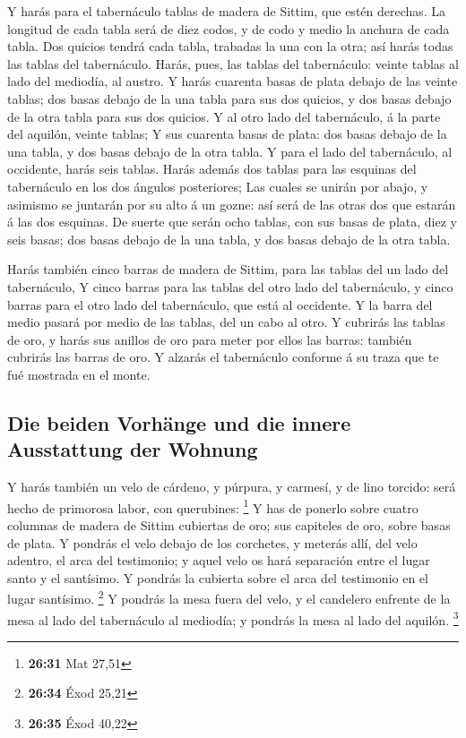  Y harás para el tabernáculo tablas de madera de Sittim,
que estén derechas.  La longitud de cada tabla será de
diez codos, y de codo y medio la anchura de cada tabla. 
Dos quicios tendrá cada tabla, trabadas la una con la otra; así harás
todas las tablas del tabernáculo.  Harás, pues, las
tablas del tabernáculo: veinte tablas al lado del mediodía, al austro.
 Y harás cuarenta basas de plata debajo de las veinte
tablas; dos basas debajo de la una tabla para sus dos quicios, y dos
basas debajo de la otra tabla para sus dos quicios.  Y al
otro lado del tabernáculo, á la parte del aquilón, veinte tablas;
 Y sus cuarenta basas de plata: dos basas debajo de la
una tabla, y dos basas debajo de la otra tabla.  Y para
el lado del tabernáculo, al occidente, harás seis tablas.
 Harás además dos tablas para las esquinas del
tabernáculo en los dos ángulos posteriores;  Las cuales
se unirán por abajo, y asimismo se juntarán por su alto á un gozne: así
será de las otras dos que estarán á las dos esquinas.  De
suerte que serán ocho tablas, con sus basas de plata, diez y seis basas;
dos basas debajo de la una tabla, y dos basas debajo de la otra tabla.

 Harás también cinco barras de madera de Sittim, para las
tablas del un lado del tabernáculo,  Y cinco barras para
las tablas del otro lado del tabernáculo, y cinco barras para el otro
lado del tabernáculo, que está al occidente.  Y la barra
del medio pasará por medio de las tablas, del un cabo al otro.
 Y cubrirás las tablas de oro, y harás sus anillos de oro
para meter por ellos las barras: también cubrirás las barras de oro.
 Y alzarás el tabernáculo conforme á su traza que te fué
mostrada en el monte.

\hypertarget{die-beiden-vorhuxe4nge-und-die-innere-ausstattung-der-wohnung}{%
\subsection{Die beiden Vorhänge und die innere Ausstattung der
Wohnung}\label{die-beiden-vorhuxe4nge-und-die-innere-ausstattung-der-wohnung}}

 Y harás también un velo de cárdeno, y púrpura, y
carmesí, y de lino torcido: será hecho de primorosa labor, con
querubines: \footnote{\textbf{26:31} Mat 27,51}  Y has de
ponerlo sobre cuatro columnas de madera de Sittim cubiertas de oro; sus
capiteles de oro, sobre basas de plata.  Y pondrás el
velo debajo de los corchetes, y meterás allí, del velo adentro, el arca
del testimonio; y aquel velo os hará separación entre el lugar santo y
el santísimo.  Y pondrás la cubierta sobre el arca del
testimonio en el lugar santísimo. \footnote{\textbf{26:34} Éxod 25,21}
 Y pondrás la mesa fuera del velo, y el candelero
enfrente de la mesa al lado del tabernáculo al mediodía; y pondrás la
mesa al lado del aquilón. \footnote{\textbf{26:35} Éxod 40,22}


